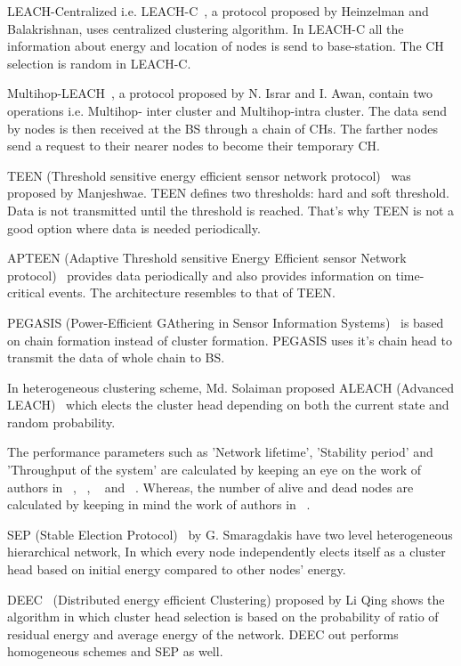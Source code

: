 \documentclass[journal]{IEEEtran}
\begin{document}
  LEACH-Centralized i.e. LEACH-C~\cite{2},  a protocol proposed by Heinzelman and Balakrishnan, uses centralized clustering algorithm. In LEACH-C all the information about energy and location of nodes is send to base-station. The CH selection is random in LEACH-C.

 Multihop-LEACH~\cite{3}, a protocol proposed by N. Israr and I. Awan, contain two operations i.e. Multihop- inter cluster and Multihop-intra cluster. The data send by nodes is then received at the BS through a chain of CHs. The farther nodes send a request to their nearer nodes to become their temporary CH.

  TEEN (Threshold sensitive energy efficient sensor network protocol)~\cite{4} was proposed by Manjeshwae. TEEN defines two thresholds: hard and soft threshold.  Data is not transmitted until the threshold is reached. That’s why TEEN is not a good option where data is needed periodically.

 APTEEN (Adaptive Threshold sensitive Energy Efficient sensor Network protocol)~\cite{5} provides data periodically and also provides information on time-critical events. The architecture resembles to that of TEEN.

  PEGASIS (Power-Efficient GAthering in Sensor Information Systems)~\cite{6} is based on chain formation instead of cluster formation. PEGASIS uses it’s chain head to transmit the data of whole chain to BS.

 In heterogeneous clustering scheme, Md. Solaiman proposed ALEACH (Advanced LEACH)~\cite{7} which elects the cluster head depending on both the current state and random probability.

  The performance parameters such as 'Network lifetime', 'Stability period' and 'Throughput of the system' are calculated by keeping an eye on the work of authors in ~\cite{8}, ~\cite{9}, ~\cite{10} and ~\cite{11}. Whereas, the number of alive and dead nodes are calculated by keeping in mind the work of authors in ~\cite{12}.

 SEP (Stable Election Protocol)~\cite{13}  by G. Smaragdakis have two level heterogeneous hierarchical network, In which every node independently elects itself as a cluster head based on initial energy compared to other nodes’ energy.

  DEEC~\cite{14} (Distributed energy efficient Clustering) proposed by Li Qing shows the algorithm in which cluster head selection is based on the probability of ratio of residual energy and average energy of the network. DEEC out performs homogeneous schemes and SEP as well.
\end{document}
